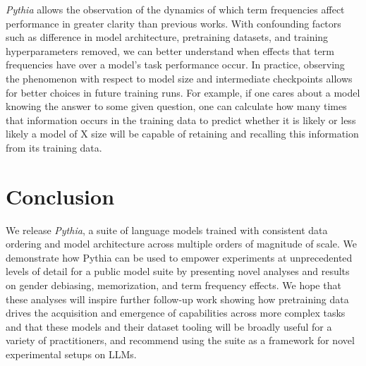 \textit{Pythia} allows the observation of the dynamics of which term frequencies affect performance in greater clarity than previous works. With confounding factors such as difference in model architecture, pretraining datasets, and training hyperparameters removed, we can better understand when effects that term frequencies have over a model's task performance occur. In practice, observing the phenomenon with respect to model size and intermediate checkpoints allows for better choices in future training runs. For example, if one cares about a model knowing the answer to some given question, one can calculate how many times that information occurs in the training data to predict whether it is likely or less likely a model of X size will be capable of retaining and recalling this information from its training data.

\section{Conclusion}\label{sec:conclusion}

We release \textit{Pythia}, a suite of language models trained with consistent data ordering and model architecture across multiple orders of magnitude of scale. We demonstrate how Pythia can be used to empower experiments at unprecedented levels of detail for a public model suite by presenting novel analyses and results on gender debiasing, memorization, and term frequency effects. We hope that these analyses will inspire further follow-up work showing how pretraining data drives the acquisition and emergence of capabilities across more complex tasks and that these models and their dataset tooling will be broadly useful for a variety of practitioners, and recommend using the suite as a framework for novel experimental setups on LLMs.


